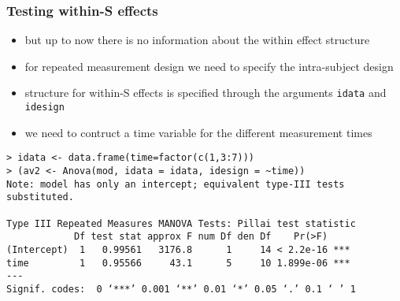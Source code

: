 
\begin{frame}[fragile]\frametitle{Testing within-S effects}
  \begin{itemize}
  \item but up to now there is no information about the within effect structure
  \item for repeated measurement design we need to specify the intra-subject design
  \item structure  for  within-S  effects is specified through the arguments \texttt{idata} and \texttt{idesign}
  \item we need to contruct a time variable for the different measurement times
  \end{itemize}\scriptsize
\begin{verbatim}
> idata <- data.frame(time=factor(c(1,3:7)))
> (av2 <- Anova(mod, idata = idata, idesign = ~time))
Note: model has only an intercept; equivalent type-III tests substituted.

Type III Repeated Measures MANOVA Tests: Pillai test statistic
            Df test stat approx F num Df den Df    Pr(>F)    
(Intercept)  1   0.99561   3176.8      1     14 < 2.2e-16 ***
time         1   0.95566     43.1      5     10 1.899e-06 ***
---
Signif. codes:  0 ‘***’ 0.001 ‘**’ 0.01 ‘*’ 0.05 ‘.’ 0.1 ‘ ’ 1  
\end{verbatim}
\end{frame}


